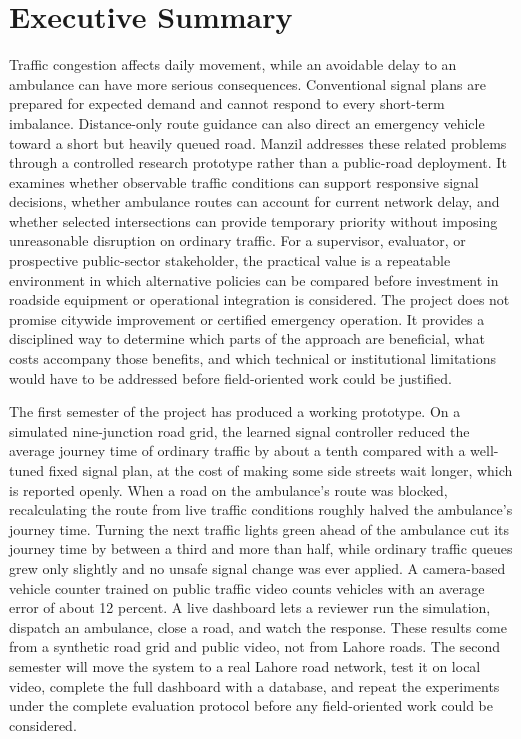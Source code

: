 \documentclass{../FYPFast/FastFyp}
\begin{document}
\cleardoublepage
\thispagestyle{empty}
\section*{Executive Summary}
Traffic congestion affects daily movement, while an avoidable delay to an ambulance can have more serious consequences. Conventional signal plans are prepared for expected demand and cannot respond to every short-term imbalance. Distance-only route guidance can also direct an emergency vehicle toward a short but heavily queued road. Manzil addresses these related problems through a controlled research prototype rather than a public-road deployment. It examines whether observable traffic conditions can support responsive signal decisions, whether ambulance routes can account for current network delay, and whether selected intersections can provide temporary priority without imposing unreasonable disruption on ordinary traffic. For a supervisor, evaluator, or prospective public-sector stakeholder, the practical value is a repeatable environment in which alternative policies can be compared before investment in roadside equipment or operational integration is considered. The project does not promise citywide improvement or certified emergency operation. It provides a disciplined way to determine which parts of the approach are beneficial, what costs accompany those benefits, and which technical or institutional limitations would have to be addressed before field-oriented work could be justified.

The first semester of the project has produced a working prototype. On a simulated nine-junction road grid, the learned signal controller reduced the average journey time of ordinary traffic by about a tenth compared with a well-tuned fixed signal plan, at the cost of making some side streets wait longer, which is reported openly. When a road on the ambulance's route was blocked, recalculating the route from live traffic conditions roughly halved the ambulance's journey time. Turning the next traffic lights green ahead of the ambulance cut its journey time by between a third and more than half, while ordinary traffic queues grew only slightly and no unsafe signal change was ever applied. A camera-based vehicle counter trained on public traffic video counts vehicles with an average error of about 12 percent. A live dashboard lets a reviewer run the simulation, dispatch an ambulance, close a road, and watch the response. These results come from a synthetic road grid and public video, not from Lahore roads. The second semester will move the system to a real Lahore road network, test it on local video, complete the full dashboard with a database, and repeat the experiments under the complete evaluation protocol before any field-oriented work could be considered.
\end{document}
